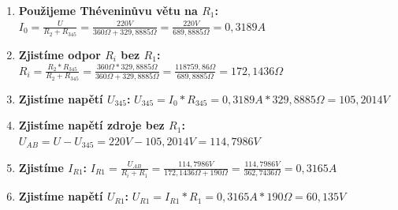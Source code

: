 \begin{enumerate}
    \item \textbf{Použijeme Théveninůvu větu na $R_1$:} \newline
    $I_0 = \frac{U}{R_2 + R_{345}} = \frac{220V}{360\Omega + 329,8885\Omega} = \frac{220V}{689,8885\Omega} = 0,3189A$
    
    \item \textbf{Zjistíme odpor $R_i$ bez $R_1$:} \newline
    $R_i = \frac{R_2 * R_{345}}{R_2 + R_{345}} = \frac{360\Omega * 329,8885\Omega}{360\Omega + 329,8885\Omega} = \frac{118759,86\Omega}{689,8885\Omega} = 172,1436\Omega$
    
    \item \textbf{Zjistíme napětí $U_{345}$:} \newline
    $U_{345} = I_0 * R_{345} = 0,3189A * 329,8885\Omega = 105,2014V$
    
    \item \textbf{Zjistíme napětí zdroje bez $R_1$:} \newline
    $U_{AB} = U - U_{345} = 220V - 105,2014V = 114,7986V$
    
    \item \textbf{Zjistíme $I_{R1}$:} \newline
    $I_{R1} = \frac{U_{AB}}{R_i + R_1} = \frac{114,7986V}{172,1436\Omega + 190\Omega} = \frac{114,7986V}{362,7436\Omega} = 0,3165A$
    
    \item \textbf{Zjistíme napětí $U_{R1}$:} \newline
    $U_{R1} = I_{R1} * R_1 = 0,3165A * 190\Omega = 60,135V$
\end{enumerate}